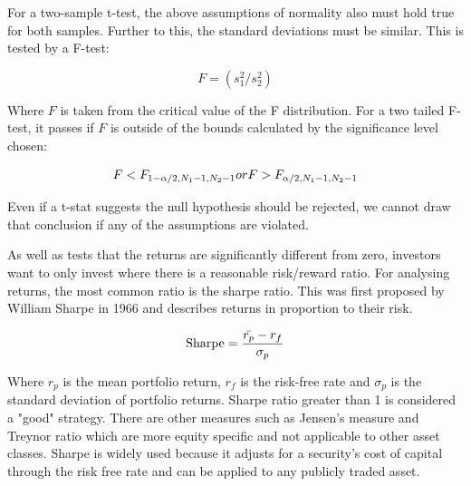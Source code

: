 For a two-sample t-test, the above assumptions of normality also must hold true for both samples. Further to this, the standard deviations must be similar. This is tested by a F-test:

\begin{equation} \label{eq:fstat}
    F = \left( s^{2}_{1}/s^{2}_{2} \right)
\end{equation}

Where $F$ is taken from the critical value of the F distribution. For a two tailed F-test, it passes if $F$ is outside of the bounds calculated by the significance level chosen:

\begin{equation} \label{eq:fdist}
    F < F_{1 - \alpha/2,N_1 - 1,N_2 - 1}  \\
    or \nonumber\\
    F > F_{\alpha/2,N_1 - 1,N_2 - 1} \nonumber\\
\end{equation}

Even if a t-stat suggests the null hypothesis should be rejected, we cannot draw that conclusion if any of the assumptions are violated\cite{knaub_hypothesis}.

As well as tests that the returns are significantly different from zero, investors want to only invest where there is a reasonable risk/reward ratio. For analysing returns, the most common ratio is the sharpe ratio\cite{perf_eval}. This was first proposed by William Sharpe in 1966\cite{sharpe_perf} and describes returns in proportion to their risk.

\begin{equation}
    \text{Sharpe} = \frac{\Bar{r_p} - r_f}{\sigma _p}
\end{equation}

Where $r_p$ is the mean portfolio return, $r_f$ is the risk-free rate and $\sigma _p$ is the standard deviation of portfolio returns. Sharpe ratio greater than 1 is considered a "good" strategy\cite{ross_corp}. There are other measures such as Jensen's measure and Treynor ratio which are more equity specific and not applicable to other asset classes. Sharpe is widely used because it adjusts for a security's cost of capital through the risk free rate and can be applied to any publicly traded asset.


